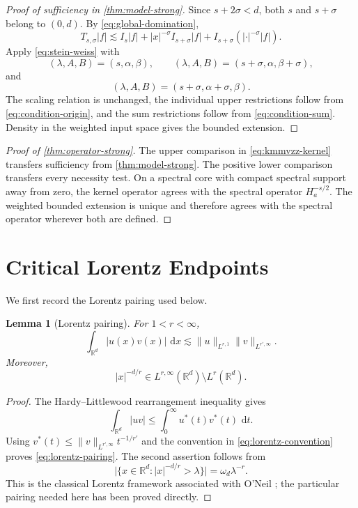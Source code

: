 \documentclass[11pt]{amsart}
\numberwithin{equation}{section}
\theoremstyle{plain}
\newtheorem{lemma}[theorem]{Lemma}
\theoremstyle{definition}
\theoremstyle{remark}
\newcommand{\RR}{\mathbb{R}}
\newcommand{\Ha}{H_a}
\newcommand{\dd}{\,\mathrm{d}}
\begin{document}
\begin{proof}[Proof of sufficiency in \cref{thm:model-strong}]
Since $s+2\sigma<d$, both $s$ and $s+\sigma$ belong to $(0,d)$. By \cref{eq:global-domination},
\begin{equation}
 T_{s,\sigma}|f|
 \lesssim
 I_s|f|
 +|x|^{-\sigma}I_{s+\sigma}|f|
 +I_{s+\sigma}(|\cdot|^{-\sigma}|f|).
 \label{eq:three-stein-weiss-pieces}
\end{equation}
Apply \cref{eq:stein-weiss} with
\[
 (\lambda,A,B)=(s,\alpha,\beta),
 \qquad
 (\lambda,A,B)=(s+\sigma,\alpha,\beta+\sigma),
\]
and
\[
 (\lambda,A,B)=(s+\sigma,\alpha+\sigma,\beta).
\]
The scaling relation is unchanged, the individual upper restrictions follow from \cref{eq:condition-origin}, and the sum restrictions follow from \cref{eq:condition-sum}. Density in the weighted input space gives the bounded extension.
\end{proof}

\begin{proof}[Proof of \cref{thm:operator-strong}]
The upper comparison in \cref{eq:kmmvzz-kernel} transfers sufficiency from \cref{thm:model-strong}. The positive lower comparison transfers every necessity test. On a spectral core with compact spectral support away from zero, the kernel operator agrees with the spectral operator $\Ha^{-s/2}$. The weighted bounded extension is unique and therefore agrees with the spectral operator wherever both are defined.
\end{proof}

\section{Critical Lorentz Endpoints}
\label{sec:lorentz}

We first record the Lorentz pairing used below.

\begin{lemma}[Lorentz pairing]
\label{lem:lorentz-pairing}
For $1<r<\infty$,
\begin{equation}
 \int_{\RR^d}|u(x)v(x)|\,\dd x
 \lesssim
 \|u\|_{L^{r,1}}\|v\|_{L^{r',\infty}}.
 \label{eq:lorentz-pairing}
\end{equation}
Moreover,
\begin{equation}
 |x|^{-d/r}\in L^{r,\infty}(\RR^d)\setminus L^r(\RR^d).
 \label{eq:critical-power-lorentz}
\end{equation}
\end{lemma}

\begin{proof}
The Hardy--Littlewood rearrangement inequality gives
\[
 \int_{\RR^d}|uv|
 \le\int_0^\infty u^*(t)v^*(t)\,\dd t.
\]
Using $v^*(t)\le \|v\|_{L^{r',\infty}}t^{-1/r'}$ and the convention in \cref{eq:lorentz-convention} proves \cref{eq:lorentz-pairing}. The second assertion follows from
\[
 \bigl|\{x\in\RR^d:|x|^{-d/r}>\lambda\}\bigr|
 =\omega_d\lambda^{-r}.
\]
This is the classical Lorentz framework associated with O'Neil \cite{ONeil1963}; the particular pairing needed here has been proved directly.
\end{proof}
\end{document}

